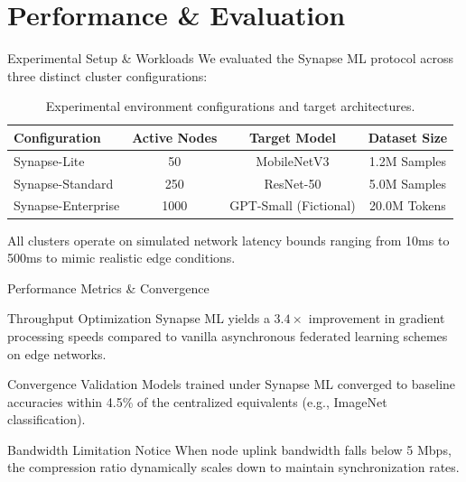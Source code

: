 \section{Performance \& Evaluation}

\begin{frame}{Experimental Setup \& Workloads}
  We evaluated the Synapse ML protocol across three distinct cluster configurations:
  \vspace{0.3cm}
  \begin{table}
    \centering
    \footnotesize
    \setlength{\tabcolsep}{5pt}
    \begin{tabular}{lccc}
      \toprule
      Configuration & Active Nodes & Target Model & Dataset Size \\
      \midrule
      Synapse-Lite & 50 & MobileNetV3 & 1.2M Samples \\
      Synapse-Standard & 250 & ResNet-50 & 5.0M Samples \\
      Synapse-Enterprise & 1000 & GPT-Small (Fictional) & 20.0M Tokens \\
      \bottomrule
    \end{tabular}
    \caption{Experimental environment configurations and target architectures.}
  \end{table}
  \vspace{0.2cm}
  All clusters operate on simulated network latency bounds ranging from 10ms to 500ms to mimic realistic edge conditions.
\end{frame}

\begin{frame}{Performance Metrics \& Convergence}
  \begin{block}{Throughput Optimization}
    Synapse ML yields a $3.4\times$ improvement in gradient processing speeds compared to vanilla asynchronous federated learning schemes on edge networks.
  \end{block}
  \begin{exampleblock}{Convergence Validation}
    Models trained under Synapse ML converged to baseline accuracies within 4.5\% of the centralized equivalents (e.g., ImageNet classification).
  \end{exampleblock}
  \begin{alertblock}{Bandwidth Limitation Notice}
    When node uplink bandwidth falls below 5 Mbps, the compression ratio dynamically scales down to maintain synchronization rates.
  \end{alertblock}
\end{frame}

